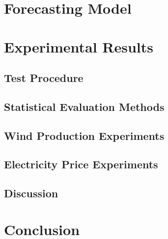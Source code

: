\documentclass[twoside,11pt,openright]{report}
\begin{document}

\chapter{Forecasting Model}







\chapter{Experimental Results}
\label{ch:experimentalResults}
\section{Test Procedure}
\label{sec:testProcedure}

\section{Statistical Evaluation Methods}
\label{sec:statisticalEvaluation}

\section{Wind Production Experiments}
\label{sec:windProductionExperiments}

\section{Electricity Price Experiments}
\label{sec:priceExperiments}

\section{Discussion}






\chapter{Conclusion}
\label{ch:conclusion}
\end{document}
